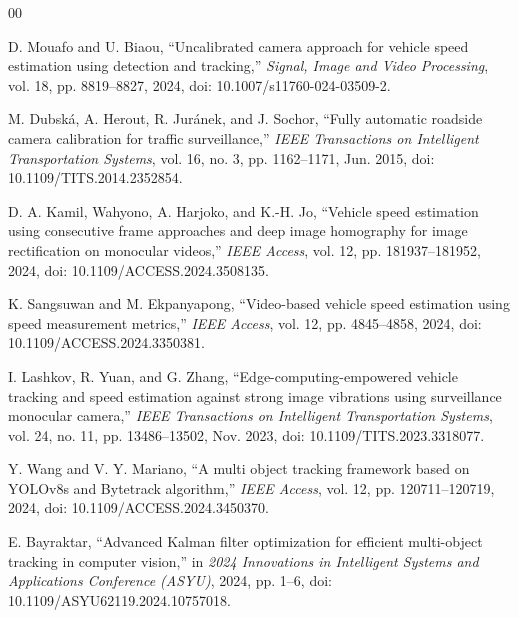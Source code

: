 \documentclass[conference]{IEEEtran}
\begin{document}
\begin{thebibliography}{00}

D. Mouafo and U. Biaou, ``Uncalibrated camera approach for vehicle speed estimation using detection and tracking,'' \textit{Signal, Image and Video Processing}, vol. 18, pp. 8819--8827, 2024, doi: 10.1007/s11760-024-03509-2.

M. Dubsk\'a, A. Herout, R. Jur\'anek, and J. Sochor, ``Fully automatic roadside camera calibration for traffic surveillance,'' \textit{IEEE Transactions on Intelligent Transportation Systems}, vol. 16, no. 3, pp. 1162--1171, Jun. 2015, doi: 10.1109/TITS.2014.2352854.

D. A. Kamil, Wahyono, A. Harjoko, and K.-H. Jo, ``Vehicle speed estimation using consecutive frame approaches and deep image homography for image rectification on monocular videos,'' \textit{IEEE Access}, vol. 12, pp. 181937--181952, 2024, doi: 10.1109/ACCESS.2024.3508135.

K. Sangsuwan and M. Ekpanyapong, ``Video-based vehicle speed estimation using speed measurement metrics,'' \textit{IEEE Access}, vol. 12, pp. 4845--4858, 2024, doi: 10.1109/ACCESS.2024.3350381.

I. Lashkov, R. Yuan, and G. Zhang, ``Edge-computing-empowered vehicle tracking and speed estimation against strong image vibrations using surveillance monocular camera,'' \textit{IEEE Transactions on Intelligent Transportation Systems}, vol. 24, no. 11, pp. 13486--13502, Nov. 2023, doi: 10.1109/TITS.2023.3318077.

Y. Wang and V. Y. Mariano, ``A multi object tracking framework based on YOLOv8s and Bytetrack algorithm,'' \textit{IEEE Access}, vol. 12, pp. 120711--120719, 2024, doi: 10.1109/ACCESS.2024.3450370.

E. Bayraktar, ``Advanced Kalman filter optimization for efficient multi-object tracking in computer vision,'' in \textit{2024 Innovations in Intelligent Systems and Applications Conference (ASYU)}, 2024, pp. 1--6, doi: 10.1109/ASYU62119.2024.10757018.

\end{thebibliography}
\end{document}
